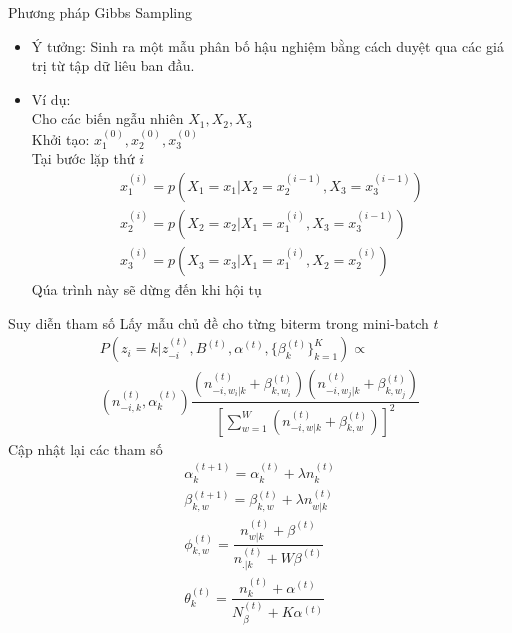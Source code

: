 \documentclass[pdf]{beamer}
\begin{document}
\begin{frame}{Phương pháp Gibbs Sampling}
\begin{itemize}
	\item Ý tưởng: Sinh ra một mẫu phân bố hậu nghiệm bằng cách duyệt qua các giá trị từ tập dữ liêu ban đầu.
	\item Ví dụ:\\
	Cho các biến ngẫu nhiên $X_1, X_2, X_3$\\
	Khởi tạo: $x_1^{(0)}, x_2^{(0)}, x_3^{(0)}$ \\
	Tại bước lặp thứ $i$
	\begin{align*}
	x_1^{(i)} = p(X_1 = x_1| X_2 = x_2^{(i-1)},  X_3 = x_3^{(i-1)})\\
	x_2^{(i)} = p(X_2 = x_2| X_1 = x_1^{(i)},  X_3 = x_3^{(i-1)}) \\
	x_3^{(i)} = p(X_3 = x_3| X_1 = x_1^{(i)},  X_2 = x_2^{(i)}) 
	\end{align*}
	Qúa trình này sẽ dừng đến khi hội tụ
\end{itemize}
\end{frame}

\begin{frame}{Suy diễn tham số}
Lấy mẫu chủ đề cho từng biterm trong mini-batch $t$
\begin{align}
P(z_i = k|z_{-i}^{(t)}, B^{(t)}, \alpha^{(t)}, \{\beta_k^{(t)}\}_{k=1}^K) \propto  \nonumber \\
(n_{-i, k} ^{(t)}, \alpha_k^{(t)})\dfrac{(n_{-i, w_i|k}^{(t)} + \beta_{k, w_i}^{(t)})(n_{-i, w_j|k}^{(t)} + \beta_{k, w_j}^{(t)})}{[\sum_{w=1}^W(n_{-i, w|k}^{(t)} + \beta_{k, w}^{(t)})]^2} 
\end{align}
Cập nhật lại các tham số
\begin{align}
\alpha_k^{(t+1)} = \alpha_k^{(t)} + \lambda n_k^{(t)} \\
\beta_{k, w}^{(t+1)} = \beta_{k, w} ^{(t)} + \lambda n_{w|k}^{(t)} \\
\phi_{k,w}^{(t)} = \dfrac{n_{w|k}^{(t)} + \beta^{(t)}}{n_{.|k}^{(t)} + W\beta^{(t)}} \\
\theta_k^{(t)} = \dfrac{n_k^{(t)} + \alpha^{(t)}}{N_\beta^{(t)} + K\alpha^{(t)}}
\end{align}
\end{frame}
\end{document}
